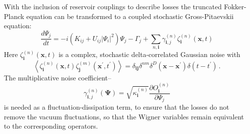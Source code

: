 \documentclass[aps,prl,twocolumn,showpacs,amsmath,amssymb,superscriptaddress]{revtex4-1}
\newcommand{\xvec}{\boldsymbol{x}}
\newcommand{\ivec}{\boldsymbol{i}}
\newcommand{\jvec}{\boldsymbol{j}}
\newcommand{\Psivec}{\boldsymbol{\Psi}}
\begin{document}
With the inclusion of reservoir couplings to describe losses
the truncated Fokker-Planck equation can be transformed
to a coupled stochastic Gross-Pitaevskii equation:
\begin{equation}
	\frac{d\Psi_{j}}{dt} = -i \left( K_{ij} + U_{ij} \lvert \Psi_{i} \rvert ^{2} \right) \Psi_{j} -
	\Gamma_{j} + \sum_{n,\ivec} \gamma_{\ivec,j}^{(n)} \zeta_{\ivec}^{(n)} (\xvec,t)
\end{equation}
Here $\zeta_{\ivec}^{(n)}(\xvec, t)$ is a complex,
stochastic delta-correlated Gaussian noise with
\begin{equation}
	\left\langle
		\zeta_{\ivec}^{(n)} (\xvec,t) \zeta_{\jvec}^{(m)}(\xvec^\prime, t^\prime)
	\right\rangle =
	\delta_{\ivec \jvec} \delta^{nm} \delta^{D} \left(
		\xvec - \xvec^\prime
	\right)
	\delta \left( t - t^\prime \right)\,.
\end{equation}
The multiplicative noise coefficient\---
\begin{equation}
	\gamma_{\ivec,j}^{(n)} \left( \Psivec \right) =
	\sqrt{\kappa_{\ivec}^{(n)}}
	\frac{\partial O_{\ivec}^{(n)}}{\partial\Psi_{j}}
\end{equation}
is needed as a fluctuation-dissipation term,
to ensure that the losses do not remove the vacuum fluctuations,
so that the Wigner variables remain equivalent to the corresponding operators.
\end{document}
